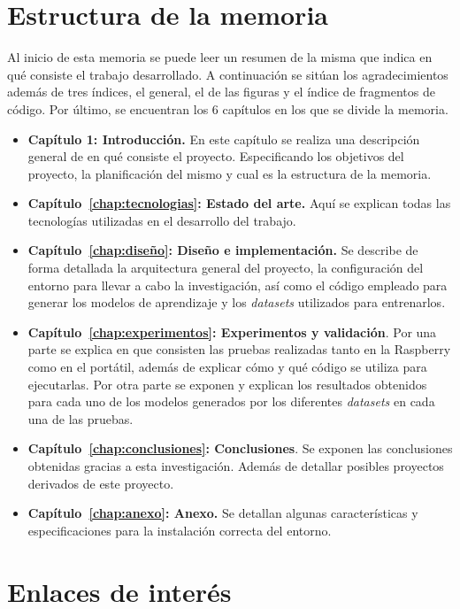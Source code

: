 \documentclass[a4paper, 12pt]{book}
\begin{document}
\section{Estructura de la memoria}
\label{sec:estructura}

Al inicio de esta memoria se puede leer un resumen de la misma que indica en qué consiste el trabajo desarrollado. A continuación se sitúan los agradecimientos además de tres índices, el general, el de las figuras y el índice de fragmentos de código. Por último, se encuentran los 6 capítulos en los que se divide la memoria.

\begin{itemize}

    \item \textbf{Capítulo 1: Introducción.} En este capítulo se realiza una descripción general de en qué consiste el proyecto. Especificando los objetivos del proyecto, la planificación del mismo y cual es la estructura de la memoria.
    \item \textbf{Capítulo~\ref{chap:tecnologias}: Estado del arte.} Aquí se explican todas las tecnologías utilizadas en el desarrollo del trabajo.
    \item \textbf{Capítulo~\ref{chap:diseño}: Diseño e implementación.} Se describe de forma detallada la arquitectura general del proyecto, la configuración del entorno para llevar a cabo la investigación, así como el código empleado para generar los modelos de aprendizaje y los \textit{datasets} utilizados para entrenarlos.
    \item \textbf{Capítulo~\ref{chap:experimentos}: Experimentos y validación}. Por una parte se explica en que consisten las pruebas realizadas tanto en la Raspberry como en el portátil, además de explicar cómo y qué código se utiliza para ejecutarlas. Por otra parte se exponen y explican los resultados obtenidos para cada uno de los modelos generados por los diferentes \textit{datasets} en cada una de las pruebas.
    \item \textbf{Capítulo~\ref{chap:conclusiones}: Conclusiones}. Se exponen las conclusiones obtenidas gracias a esta investigación. Además de detallar posibles proyectos derivados de este proyecto.
    \item \textbf{Capítulo~\ref{chap:anexo}: Anexo.} Se detallan algunas características y especificaciones para la instalación correcta del entorno.
\end{itemize}

\section{Enlaces de interés}
\label{sec:enlaces_interes}
\end{document}
